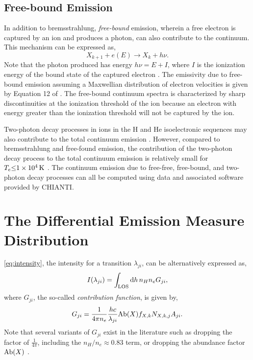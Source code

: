 \subsection{Free-bound Emission}

In addition to bremsstrahlung, \textit{free-bound} emission, wherein a free electron is captured by an ion and produces a photon, can also contribute to the continuum. This mechanism can be expressed as,
\begin{equation}\label{eq:free_bound_process}
    X_{k+1} + e(E) \to X_{k} + h\nu.
\end{equation}
Note that the photon produced has energy $h\nu=E+I$, where $I$ is the ionization energy of the bound state of the captured electron \citep{del_zanna_solar_2018}. The emissivity due to free-bound emission assuming a Maxwellian distribution of electron velocities is given by Equation 12 of \citet{young_chianti-atomic_2003}. The free-bound continuum spectra is characterized by sharp discontinuities at the ionization threshold of the ion because an electron with energy greater than the ionization threshold will not be captured by the ion. 

Two-photon decay processes in ions in the H and He isoelectronic sequences may also contribute to the total continuum emission \citep{young_chianti-atomic_2003}. However, compared to bremsstrahlung and free-found emission, the contribution of the two-photon decay process to the total continuum emission is relatively small for $T_e\SI{\le 1e4}{\kelvin}$ \citep{del_zanna_solar_2018}. The continuum emission due to free-free, free-bound, and two-photon decay processes can all be computed using data and associated software provided by CHIANTI.

\section{The Differential Emission Measure Distribution}\label{sec:dem}


\autoref{eq:intensity}, the intensity for a transition $\lambda_{ji}$, can be alternatively expressed as,
\begin{equation}
    I(\lambda_{ji}) = \int_\textup{LOS}\textup{d}h\,n_Hn_eG_{ji},
\end{equation}
where $G_{ji}$, the so-called \textit{contribution function}, is given by,
\begin{equation}\label{eq:contribution_function}
    G_{ji} = \frac{1}{4\pi n_e}\frac{hc}{\lambda_{ji}}\textup{Ab}(X)f_{X,k}N_{X,k,j}A_{ji}.
\end{equation}
Note that several variants of $G_{ji}$ exist in the literature such as dropping the factor of $\frac{1}{4\pi}$, including the $n_H/n_e\approx0.83$ term, or dropping the abundance factor $\textup{Ab}(X)$ \citep[see section 3.1 of][]{del_zanna_solar_2018}.

